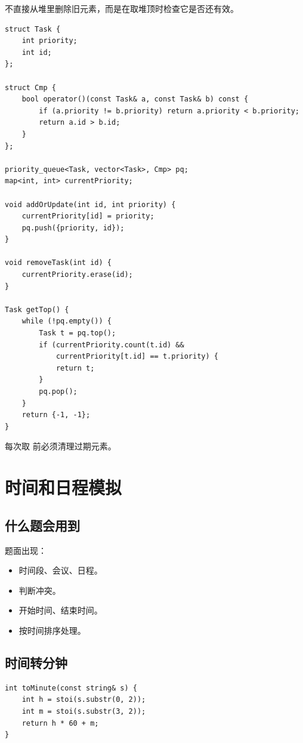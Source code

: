 不直接从堆里删除旧元素，而是在取堆顶时检查它是否还有效。

\begin{lstlisting}
struct Task {
    int priority;
    int id;
};

struct Cmp {
    bool operator()(const Task& a, const Task& b) const {
        if (a.priority != b.priority) return a.priority < b.priority;
        return a.id > b.id;
    }
};

priority_queue<Task, vector<Task>, Cmp> pq;
map<int, int> currentPriority;

void addOrUpdate(int id, int priority) {
    currentPriority[id] = priority;
    pq.push({priority, id});
}

void removeTask(int id) {
    currentPriority.erase(id);
}

Task getTop() {
    while (!pq.empty()) {
        Task t = pq.top();
        if (currentPriority.count(t.id) &&
            currentPriority[t.id] == t.priority) {
            return t;
        }
        pq.pop();
    }
    return {-1, -1};
}
\end{lstlisting}

每次取  前必须清理过期元素。

\section{时间和日程模拟}\label{sec:07-25}

\subsection{什么题会用到}

题面出现：

\begin{itemize}
  \item 时间段、会议、日程。
  \item 判断冲突。
  \item 开始时间、结束时间。
  \item 按时间排序处理。
\end{itemize}

\subsection{时间转分钟}

\begin{lstlisting}
int toMinute(const string& s) {
    int h = stoi(s.substr(0, 2));
    int m = stoi(s.substr(3, 2));
    return h * 60 + m;
}
\end{lstlisting}

